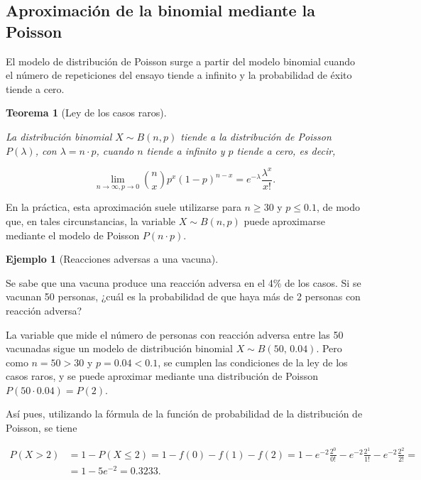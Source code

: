 \documentclass[
  spanish,
  a4paper,
]{scrreport}
\theoremstyle{plain}
\newtheorem{theorem}{Teorema}[chapter]
\theoremstyle{definition}
\newtheorem{example}{Ejemplo}[chapter]
\theoremstyle{definition}
\theoremstyle{remark}
\begin{document}
\subsection{Aproximación de la binomial mediante la
Poisson}\label{aproximaciuxf3n-de-la-binomial-mediante-la-poisson}

El modelo de distribución de Poisson surge a partir del modelo binomial
cuando el número de repeticiones del ensayo tiende a infinito y la
probabilidad de éxito tiende a cero.

\begin{theorem}[Ley de los casos
raros]\protect\hypertarget{thm-ley-casos-raros}{}\label{thm-ley-casos-raros}

La distribución binomial \(X\sim B(n,p)\) tiende a la distribución de
Poisson \(P(\lambda)\), con \(\lambda=n\cdot p\), cuando \(n\) tiende a
infinito y \(p\) tiende a cero, es decir,

\[
\lim_{n\rightarrow \infty, p\rightarrow 0}\binom{n}{x}p^x(1-p)^{n-x} = e^{-\lambda}\frac{\lambda^x}{x!}.
\]

\end{theorem}

En la práctica, esta aproximación suele utilizarse para \(n\geq 30\) y
\(p\leq 0.1\), de modo que, en tales circunstancias, la variable
\(X\sim B(n,p)\) puede aproximarse mediante el modelo de Poisson
\(P(n\cdot p)\).

\begin{example}[Reacciones adversas a una
vacuna]\protect\hypertarget{exm-aproximacion-poisson-vacuna}{}\label{exm-aproximacion-poisson-vacuna}

Se sabe que una vacuna produce una reacción adversa en el 4\% de los
casos. Si se vacunan 50 personas, ¿cuál es la probabilidad de que haya
más de 2 personas con reacción adversa?

La variable que mide el número de personas con reacción adversa entre
las 50 vacunadas sigue un modelo de distribución binomial
\(X\sim B(50,\,0.04)\). Pero como \(n=50>30\) y \(p=0.04<0.1\), se
cumplen las condiciones de la ley de los casos raros, y se puede
aproximar mediante una distribución de Poisson \(P(50\cdot 0.04)=P(2)\).

Así pues, utilizando la fórmula de la función de probabilidad de la
distribución de Poisson, se tiene

\[
\begin{aligned}
P(X>2) &= 1 -P(X\leq 2) = 1-f(0)-f(1)-f(2) = 1-e^{-2}\frac{2^0}{0!}-e^{-2}\frac{2^1}{1!}-e^{-2}\frac{2^2}{2!} =\\
&= 1-5e^{-2} = 0.3233.
\end{aligned}
\]

\end{example}
\end{document}
